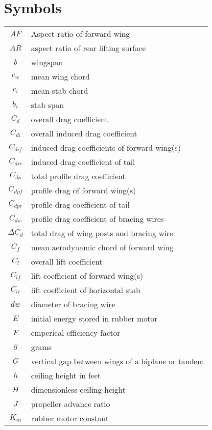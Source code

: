 \section{Symbols}

\begin{center}
\begin{tabular}{ |c|l| }
	$AF$ & Aspect ratio of forward wing \\
  $AR$ & aspect ratio of rear lifting surface \\
  $b$ & wingspan \\
    $c_w$ & mean wing chord \\
    $c_t$ & mean stab chord \\
  $b_r$ & stab span \\
  $C_d$ & overall drag coefficient \\
  $C_{di}$ & overall induced drag coefficient \\
  $C_{dif}$ & induced drag coefficients of forward wing(s) \\
  $C_{dir}$ & induced drag coefficient of tail \\
  $C_{dp}$ & total profile drag coefficient \\
  $C_{dpf}$ & profile drag of forward wing(s) \\
  $C_{dpr}$ & profile drag coefficient of tail \\
  $C_{dw}$ & profile drag coefficient of bracing wires \\
  $\Delta{C_d}$ & total drag of wing posts and bracing wire \\
  $C_f$ & mean aerodynamic chord of forward wing \\
	$C_l$ & overall lift coefficient \\
	$C_{lf}$ & lift coefficient of forward wing(s) \\
	$C_{lr}$ & lift coefficient of horizontal stab \\
	$dw$ & diameter of bracing wire \\
	$E$ & initial energy stored in rubber motor \\
	$F$ & emperical efficiency factor \\
    $g$ & grams \\
	$G$ & vertical gap between wings of a biplane or tandem \\
	$h$ & ceiling height in feet \\
	$H$ & dimensionless ceiling height \\
	$J$ & propeller advance ratio \\
	$K_m$ & rubber motor constant \\

\end{tabular}
\end{center}
